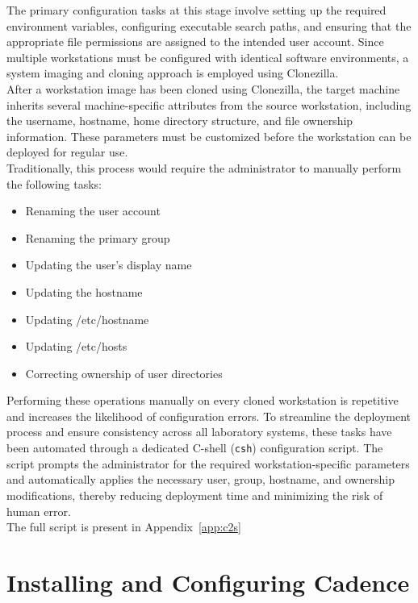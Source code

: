 The primary configuration tasks at this stage involve setting up the required environment variables, configuring executable search paths, and ensuring that the appropriate file permissions are assigned to the intended user account. Since multiple workstations must be configured with identical software environments, a system imaging and cloning approach is employed using Clonezilla. \\

After a workstation image has been cloned using Clonezilla, the target machine inherits several machine-specific attributes from the source workstation, including the username, hostname, home directory structure, and file ownership information. These parameters must be customized before the workstation can be deployed for regular use.\\

Traditionally, this process would require the administrator to manually perform the following tasks:

\begin{itemize}
	\item Renaming the user account
	\item Renaming the primary group
	\item Updating the user's display name
	\item Updating the hostname
	\item Updating /etc/hostname
	\item Updating /etc/hosts
	\item Correcting ownership of user directories
\end{itemize}

Performing these operations manually on every cloned workstation is repetitive and increases the likelihood of configuration errors. To streamline the deployment process and ensure consistency across all laboratory systems, these tasks have been automated through a dedicated C-shell (\texttt{csh}) configuration script. The script prompts the administrator for the required workstation-specific parameters and automatically applies the necessary user, group, hostname, and ownership modifications, thereby reducing deployment time and minimizing the risk of human error. \\

The full script is present in Appendix~\ref{app:c2s}


\section{Installing and Configuring Cadence}

